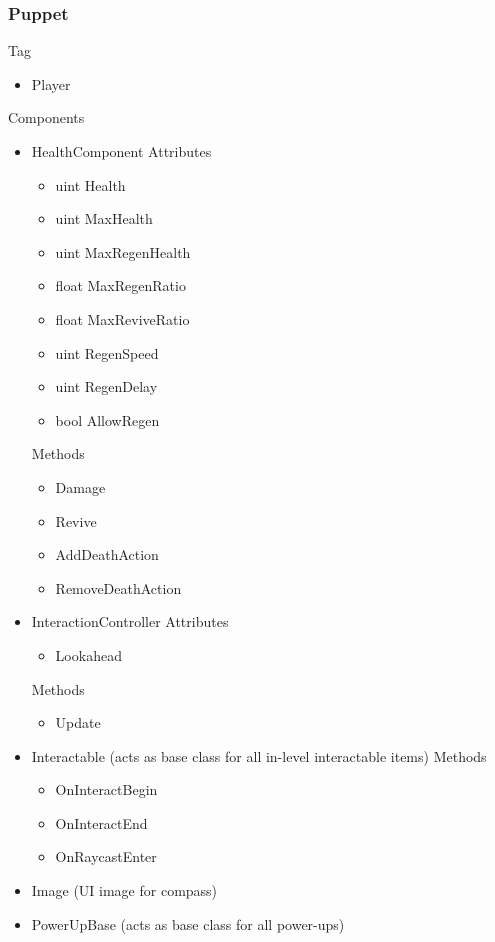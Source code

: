 \documentclass[11pt]{article}
\begin{document}
\subsubsection{Puppet}
Tag
\begin{itemize}
	\item Player
\end{itemize}
Components
\begin{itemize}
	\item HealthComponent
	\newline Attributes
	\begin{itemize}
		\item uint Health
		\item uint MaxHealth
		\item uint MaxRegenHealth
		\item float MaxRegenRatio
		\item float MaxReviveRatio
		\item uint RegenSpeed
		\item uint RegenDelay
		\item bool AllowRegen
	\end{itemize}
	Methods
	\begin{itemize}
		\item Damage
		\item Revive
		\item AddDeathAction
		\item RemoveDeathAction
	\end{itemize}
	\item InteractionController
	\newline Attributes
	\begin{itemize}
		\item Lookahead
	\end{itemize}
	Methods
	\begin{itemize}
		\item Update
	\end{itemize}
	\item Interactable (acts as base class for all in-level interactable items)
	\newline Methods
	\begin{itemize}
		\item OnInteractBegin
		\item OnInteractEnd
		\item OnRaycastEnter
	\end{itemize}
	\item Image (UI image for compass)
\newpage
	\item PowerUpBase (acts as base class for all power-ups)

\end{itemize}
\end{document}
